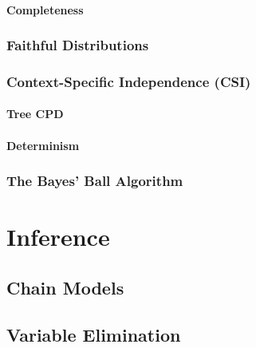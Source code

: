             \subsubsection{Completeness} %

        \subsection{Faithful Distributions} %

        \subsection{Context-Specific Independence (CSI)} %

            \subsubsection{Tree CPD} %

            \subsubsection{Determinism} %

        \subsection{The Bayes' Ball Algorithm} %

\chapter{Inference} %

    \section{Chain Models} %

    \section{Variable Elimination} %

